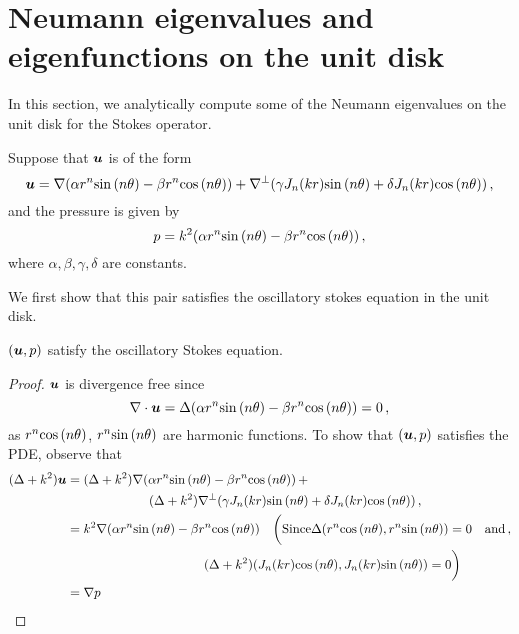 \section{Neumann eigenvalues and eigenfunctions on the unit disk}
In this section, we analytically compute some of the Neumann eigenvalues
on the unit disk for the Stokes operator.

Suppose that ${\boldsymbol u}$ is of the form
\begin{equation}
{\boldsymbol u} = \nabla (\alpha r^{n} {\sin{(n \theta)}} - \beta r^{n} {\cos{(n \theta)}}) + \nabla^{\perp}(\gamma J_{n}(kr) {\sin{(n \theta)}} + \delta J_{n}(kr) {\cos{(n \theta)}}) \, ,
\end{equation}
and the pressure is given by
\begin{equation}
p = k^2 (\alpha r^{n} {\sin{(n \theta)}} - \beta r^{n} {\cos{(n \theta)}}) \, ,
\end{equation}
where $\alpha,\beta,\gamma,\delta$ are constants.

We first show that this pair satisfies the oscillatory stokes equation
in the unit disk.
\begin{lemma}
$({\boldsymbol u},p)$ satisfy the oscillatory Stokes equation.
\end{lemma}
\begin{proof}
${\boldsymbol u}$ is divergence free since
\begin{equation}
\nabla \cdot {\boldsymbol u}  = \Delta (\alpha r^{n} {\sin{(n \theta)}} - \beta r^{n} {\cos{(n \theta)}}) = 0 \, ,
\end{equation}
as $r^{n} {\cos{(n \theta)}}$,  $r^{n} {\sin{(n \theta)}}$ are harmonic functions. 
To show that $({\boldsymbol u},p)$ satisfies the PDE, observe that
\begin{equation}
\begin{aligned}
(\Delta + k^2) \bu &= (\Delta + k^2) \nabla (\alpha r^{n} \sint - \beta r^{n} \cost) \, + \\
\quad & \hspace*{15ex} (\Delta + k^2) \nabla^{\perp} (\gamma \jnkr \sint + \delta \jnkr \cost) \, , \\
&= k^2 \nabla (\alpha r^{n} \sint - \beta r^{n} \cost) \quad \bigg(\text{Since} \Delta (r^{n}\cost, r^{n}\sint) = 0 \quad
\text{and} \, ,\\
& \hspace*{25ex} (\Delta + k^2) (\jnkr \cost, \jnkr \sint) = 0 \bigg) \\
&= \nabla p
\end{aligned}
\end{equation}
\end{proof}

